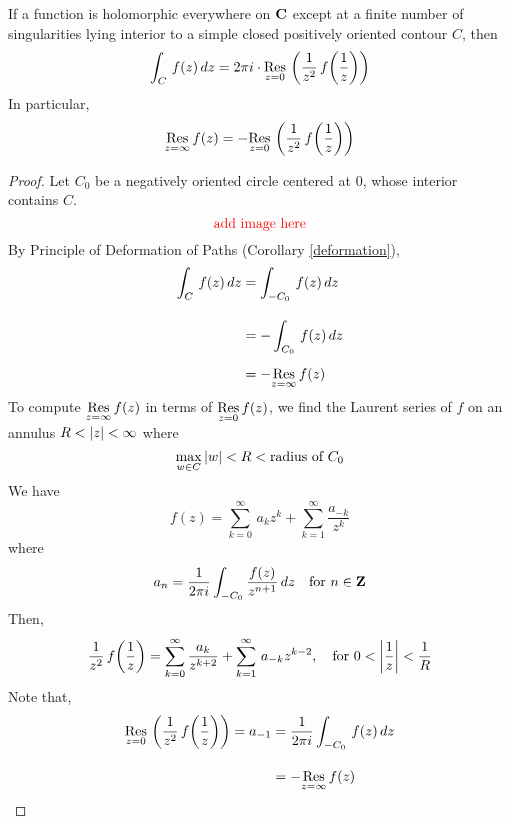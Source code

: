 \vspace*{1em}

\begin{theorem}\label{resinfty}
If a function is holomorphic everywhere on $\mathbf C$ except at a finite number of singularities lying interior to a simple closed positively oriented contour $C$, then
\[\int_C\,f(z)\,dz = 2\pi i\cdot\underset{z = {0}}{\operatorname{Res}}\,\left(\frac{1}{z^2}\,f\!\left(\frac{1}{z}\right)\right)\]
In particular,
\[\underset{z = {\infty}}{\operatorname{Res}}\,f(z) = -\underset{z = {0}}{\operatorname{Res}}\,\left(\frac{1}{z^2}\,f\!\left(\frac{1}{z}\right)\right)\]
\end{theorem}
\begin{proof}
Let $C_0$ be a negatively oriented circle centered at $0$, whose interior contains $C$.
\[\text{\color{red}add image here}\]
By Principle of Deformation of Paths (Corollary \ref{deformation}),
\begin{align*}
\int_C\,f(z)\,dz &= \int_{-C_0}\,f(z)\,dz\\[1em]
 &= -\int_{C_0}\,f(z)\,dz\\[0.5em]
 &= -\underset{z = {\infty}}{\operatorname{Res}}\,f(z)
\end{align*}
To compute $\underset{z = {\infty}}{\operatorname{Res}}\,f(z)$ in terms of $\underset{z = {0}}{\operatorname{Res}}\,f(z)$, we find the Laurent series of $f$ on an annulus $R < \left\lvert z\right\rvert < \infty$ where 
\[\max_{w\in C}\left\lvert w\right\rvert < R < \text{radius of $C_0$}\]
We have
\[f(z) = \sum_{k=0}^\infty\, a_kz^k + \sum_{k=1}^\infty\frac{a_{-k}}{z^k}\]
where
\[a_n = \frac{1}{2\pi i}\int_{-C_0}\frac{f(z)}{z^{n+1}}\,dz \quad \text{for } n \in \mathbf Z\]
Then,
\[\frac{1}{z^2}\,f\!\left(\frac{1}{z}\right) = \sum_{k=0}^\infty \frac{a_k}{z^{k+2}} + \sum_{k=1}^\infty\,a_{-k}z^{k-2},\quad \text{for }0 < \left\lvert\frac{1}{z}\right\rvert < \frac{1}{R}\]
Note that,
\begin{align*}
\underset{z = {0}}{\operatorname{Res}}\,\left(\frac{1}{z^2}\,f\!\left(\frac{1}{z}\right)\right) = a_{-1} &= \frac{1}{2\pi i}\int_{-C_0}\,f(z)\,dz\\[1em]
&= -\underset{z = {\infty}}{\operatorname{Res}}\,f(z)
\end{align*}
\end{proof}

\vspace*{1em}

